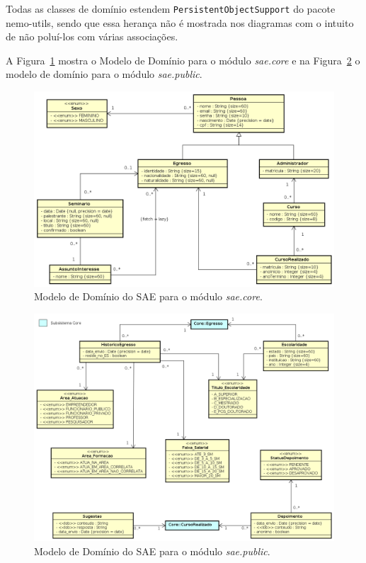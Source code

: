 Todas as classes de domínio estendem \texttt{PersistentObjectSupport} do pacote nemo-utils, sendo que essa herança não é mostrada nos diagramas com o intuito de não poluí-los com várias associações.

A Figura~\ref{figura-modelo-dominio-core} mostra o Modelo de Domínio para o módulo \textit{sae.core} e na Figura~\ref{figura-modelo-dominio-publico} o modelo de domínio para o módulo \textit{sae.public}.

\begin{figure}[h]
  \centering
  \includegraphics[width=1\textwidth]{figuras/fig-projeto-core-modelo-dominio}
  \caption{Modelo de Domínio do SAE para o módulo \textit{sae.core}.}
  \label{figura-modelo-dominio-core}
\end{figure} 
	
	
\begin{figure}[!h]
  \centering
  \includegraphics[width=1\textwidth]{figuras/modelodominiopublico.png}
  \caption{Modelo de Domínio do SAE para o módulo \textit{sae.public}.}
  \label{figura-modelo-dominio-publico}
\end{figure} 



